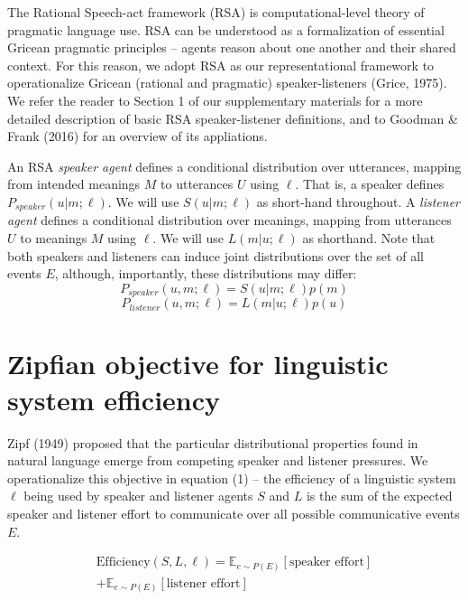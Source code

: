 \documentclass[10pt, letterpaper]{article}
\begin{document}
The Rational Speech-act framework (RSA) is computational-level theory of
pragmatic language use. RSA can be understood as a formalization of
essential Gricean pragmatic principles -- agents reason about one
another and their shared context. For this reason, we adopt RSA as our
representational framework to operationalize Gricean (rational and
pragmatic) speaker-listeners (Grice, 1975). We refer the reader to
Section 1 of our supplementary materials for a more detailed description
of basic RSA speaker-listener definitions, and to Goodman \& Frank
(2016) for an overview of its appliations.\par

An RSA \emph{speaker agent} defines a conditional distribution over
utterances, mapping from intended meanings \(M\) to utterances \(U\)
using \(\ell\). That is, a speaker defines \(P_{speaker}(u|m;\ell)\). We
will use \(S(u|m;\ell)\) as short-hand throughout. A \emph{listener
agent} defines a conditional distribution over meanings, mapping from
utterances \(U\) to meanings \(M\) using \(\ell\). We will use
\(L(m|u; \ell)\) as shorthand. Note that both speakers and listeners can
induce joint distributions over the set of all events \(E\), although,
importantly, these distributions may differ:
\[P_{speaker}(u, m; \ell) = S(u|m; \ell)p(m)\]
\[P_{listener}(u, m; \ell) = L(m|u; \ell)p(u)\]

\section{Zipfian objective for linguistic system
efficiency}\label{zipfian-objective-for-linguistic-system-efficiency}

Zipf (1949) proposed that the particular distributional properties found
in natural language emerge from competing speaker and listener
pressures. We operationalize this objective in equation (1) -- the
efficiency of a linguistic system \(\ell\) being used by speaker and
listener agents \(S\) and \(L\) is the sum of the expected speaker and
listener effort to communicate over all possible communicative events
\(E\).\par

\begin{equation}
\begin{split}
  \text{Efficiency}(S, L, \ell) = \mathbb{E}_{e \sim P(E)}[\text{speaker effort}] \\+ \mathbb{E}_{e \sim P(E)}[\text{listener effort}]
\end{split}
\end{equation}
\end{document}
